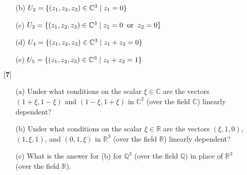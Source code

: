 \documentclass[12pt]{article}
\begin{document}
\begin{itemize}
\begin{itemize}
    \vspace{.3cm}
    \item[(b)]
    $U_2 = \{ (z_1,z_2,z_3) \in \mathbb{C}^3 \hspace{.1cm} | \hspace{.1cm} z_1 = 0 \}$
    
    \vspace{.3cm}
    \item[(c)]
    $U_3 = \{ (z_1,z_2,z_3) \in \mathbb{C}^3 \hspace{.1cm} | \hspace{.1cm} z_1 = 0 \hspace{.2cm} \text{or} \hspace{.2cm} z_2 = 0 \}$
    
    \vspace{.3cm}
    \item[(d)]
    $U_4 = \{ (z_1,z_2,z_3) \in \mathbb{C}^3 \hspace{.1cm} | \hspace{.1cm} z_1 + z_2 = 0 \}$
    
    \vspace{.3cm}
    \item[(e)]
    $U_5 = \{ (z_1,z_2,z_3) \in \mathbb{C}^3 \hspace{.1cm} | \hspace{.1cm} z_1 + z_2 = 1 \}$
    
    \end{itemize}
    
    \vspace{.5cm}
    
    \item[$\textbf{[7]}$]%
    \begin{itemize}
    
    \item[(a)]
    Under what conditions on the scalar $\xi \in \mathbb{C}$ are the vectors $(1 + \xi, 1 - \xi)$ and $(1 - \xi, 1 + \xi)$ in $\mathbb{C}^2$ (over the field $\mathbb{C}$) linearly dependent?
    
    \vspace{.3cm}
    \item[(b)]
    Under what conditions on the scalar $\xi \in \mathbb{R}$ are the vectors $(\xi,1,0)$, $(1,\xi,1)$, and $(0,1,\xi)$ in $\mathbb{R}^3$ (over the field $\mathbb{R}$) linearly dependent?
    
    \vspace{.3cm}
    \item[(c)]
    What is the answer for (b) for $\mathbb{Q}^3$ (over the field $\mathbb{Q}$) in place of $\mathbb{R}^3$ (over the field $\mathbb{R}$). 
    

\end{itemize}
\end{itemize}
\end{document}
